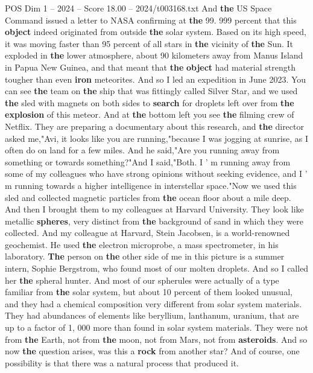 \begin{textsample}{POS Dim 1 – 2024 – Score 18.00 – 2024/t003168.txt}
And \textbf{the} US Space Command issued a letter to NASA confirming at \textbf{the} 99. 999 percent that this \textbf{object} indeed originated from outside \textbf{the} solar system.
Based on its high speed, it was moving faster than 95 percent of all stars in \textbf{the} vicinity of \textbf{the} Sun.
It exploded in \textbf{the} lower atmosphere, about 90 kilometers away from Manus Island in Papua New Guinea, and that meant that \textbf{the} \textbf{object} had material strength tougher than even \textbf{iron} meteorites.
And so I led an expedition in June 2023.
You can see \textbf{the} team on \textbf{the} ship that was fittingly called Silver Star, and we used \textbf{the} sled with magnets on both sides to \textbf{search} for droplets left over from \textbf{the} \textbf{explosion} of this meteor.
And at \textbf{the} bottom left you see \textbf{the} filming crew of Netflix.
They are preparing a documentary about this research, and \textbf{the} director asked me,"Avi, it looks like you are running,"because I was jogging at sunrise, as I often do on land for a few miles.
And he said,"Are you running away from something or towards something?"And I said,"Both.
I ' m running away from some of my colleagues who have strong opinions without seeking evidence, and I ' m running towards a higher intelligence in interstellar space."Now we used this sled and collected magnetic particles from \textbf{the} ocean floor about a mile deep.
And then I brought them to my colleagues at Harvard University.
They look like metallic \textbf{spheres}, very distinct from \textbf{the} background of sand in which they were collected.
And my colleague at Harvard, Stein Jacobsen, is a world-renowned geochemist.
He used \textbf{the} electron microprobe, a mass spectrometer, in his laboratory. \textbf{The} person on \textbf{the} other side of me in this picture is a summer intern, Sophie Bergstrom, who found most of our molten droplets.
And so I called her \textbf{the} spheral hunter.
And most of our spherules were actually of a type familiar from \textbf{the} solar system, but about 10 percent of them looked unusual, and they had a chemical composition very different from solar system materials.
They had abundances of elements like beryllium, lanthanum, uranium, that are up to a factor of 1, 000 more than found in solar system materials.
They were not from \textbf{the} Earth, not from \textbf{the} moon, not from Mars, not from \textbf{asteroids}.
And so now \textbf{the} question arises, was this a \textbf{rock} from another star?
And of course, one possibility is that there was a natural process that produced it.

\end{textsample}
